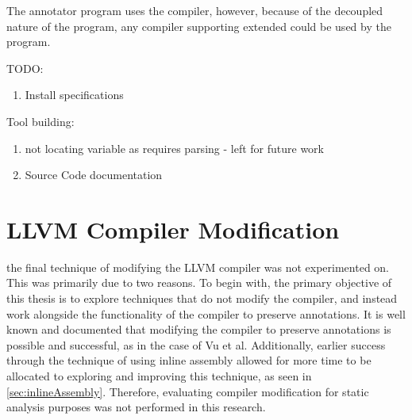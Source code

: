 The annotator program uses the  compiler, however, because of the decoupled nature of the program, any compiler supporting extended  could be used by the program. 

TODO:
\begin{enumerate}
    \item Install specifications
\end{enumerate}

Tool building:
\begin{enumerate}
    \item not locating variable as requires parsing - left for future work
    \item Source Code documentation
\end{enumerate}


\clearpage

\section{LLVM Compiler Modification}
the final technique of modifying the LLVM compiler was not experimented on. This was primarily due to two reasons. To begin with, the primary objective of this thesis is to explore techniques that do not modify the compiler, and instead work alongside the functionality of the compiler to preserve annotations. It is well known and documented that modifying the compiler to preserve annotations is possible and successful, as in the case of Vu et al. \cite{vu2020secure} Additionally, earlier success through the technique of using inline assembly allowed for more time to be allocated to exploring and improving this technique, as seen in \ref{sec:inlineAssembly}. Therefore, evaluating compiler modification for static analysis purposes was not performed in this research.


